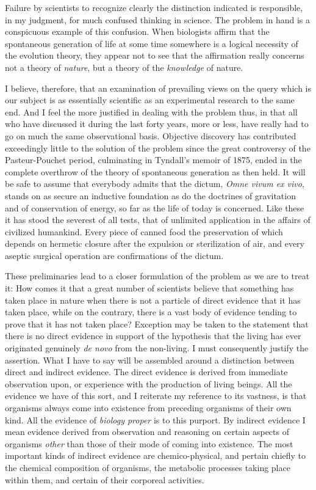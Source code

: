 \documentclass[a4paper, 11pt, oneside, polutonikogreek, english]{article}
\begin{document}
Failure by scientists to recognize clearly the distinction indicated is responsible, in my judgment, for much confused thinking in science. The problem in hand is a conspicuous example of this confusion. When biologists affirm that the spontaneous generation of life at some time somewhere is a logical necessity of the evolution theory, they appear not to see that the affirmation really concerns not a theory of \emph{nature}, but a theory of the \emph{knowledge} of nature.

I believe, therefore, that an examination of prevailing views on the query which is our subject is as essentially scientific as an experimental research to the same end. And I feel the more justified in dealing with the problem thus, in that all who have discussed it during the last forty years, more or less, have really had to go on much the same observational basis. Objective discovery has contributed exceedingly little to the solution of the problem since the great controversy of the Pasteur-Pouchet period, culminating in Tyndall's memoir of 1875, ended in the complete overthrow of the theory of spontaneous generation as then held. It will be safe to assume that everybody admits that the dictum, \emph{Omne vivum ex vivo}, stands on as secure an inductive foundation as do the doctrines of gravitation and of conservation of energy, so far as the life of today is concerned. Like these it has stood the severest of all tests, that of unlimited application in the affairs of civilized humankind. Every piece of canned food the preservation of which depends on hermetic closure after the expulsion or sterilization of air, and every aseptic surgical operation are confirmations of the dictum.

These preliminaries lead to a closer formulation of the problem as we are to treat it: How comes it that a great number of scientists believe that something has taken place in nature when there is not a particle of direct evidence that it has taken place, while on the contrary, there is a vast body of evidence tending to prove that it has not taken place? Exception may be taken to the statement that there is no direct evidence in support of the hypothesis that the living has ever originated genuinely \emph{de novo} from the non-living. I must consequently justify the assertion. What I have to say will be assembled around a distinction between direct and indirect evidence. The direct evidence is derived from immediate observation upon, or experience with the production of living beings. All the evidence we have of this sort, and I reiterate my reference to its vastness, is that organisms always come into existence from preceding organisms of their own kind. All the evidence of \emph{biology proper} is to this purport. By indirect evidence I mean evidence derived from observation and reasoning on certain aspects of organisms \emph{other} than those of their mode of coming into existence. The most important kinds of indirect evidence are chemico-physical, and pertain chiefly to the chemical composition of organisms, the metabolic processes taking place within them, and certain of their corporeal activities.
\end{document}

